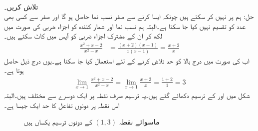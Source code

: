 \\
 تلاش کریں۔\\
حل:\quad
ہم  پر نہیں کر سکتے ہیں چونکہ ایسا کرنے سے صفر نسب نما حاصل ہو گا اور صفر سے کسی بھی عدد کو تقسیم نہیں کیا جا سکتا ہے۔البتہ ہم نسب نما اور شمار کنندہ کو اجزاء ضربی کی صورت میں لکھ کر ان کے مشترک اجزاء ضربی  کو آپس میں کاٹ سکتے ہیں۔
\begin{align*}
\frac{x^2+x-2}{x^2-x}&=\frac{(x+2)(x-1)}{x(x-1)}=\frac{x+2}{x}
\end{align*}
اب  کی صورت میں  درج بالا کو حد تلاش کرنے کے لئے  استعمال کیا جا سکتا ہے۔یوں درج ذیل حاصل ہوتا ہے۔
\begin{align*}
\lim_{x \to 1} \frac{x^2+x-2}{x^2-x}=\lim_{x\to 1}\frac{x+2}{x}=\frac{1+2}{1}=3
\end{align*}
شکل  میں  اور  کے ترسیم دکھائے گئے ہیں۔یہ ترسیم صرف نقطہ  پر ایک دوسرے سے مختلف ہیں۔البتہ اس نقطہ پر دونوں تفاعل کا حد ایک جیسا ہے۔ 
%
\begin{figure}
\centering
\begin{subfigure}{0.5\textwidth}
\centering
{}
\caption{}
\end{subfigure}%
\begin{subfigure}{0.5\textwidth}
\centering
{}
\caption{}
\end{subfigure}%
\caption{ماسوائے نقطہ $(1,3)$ کے دونوں ترسیم یکساں ہیں}
\label{شکل_مثال_حد_اجزاء_منسوخ_الف}
\end{figure}
